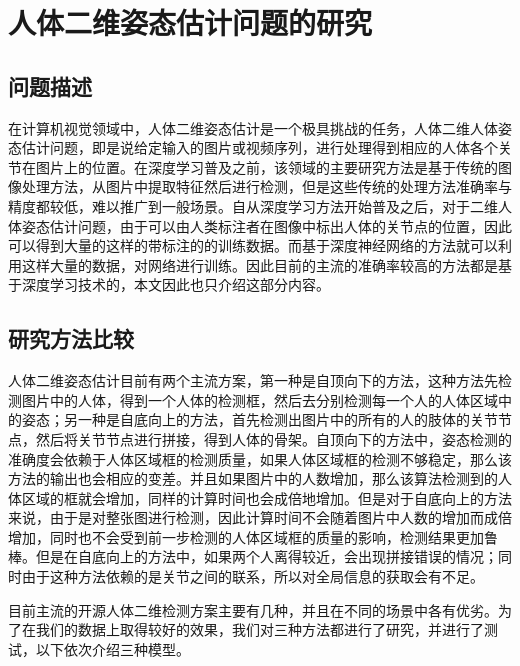 \section{人体二维姿态估计问题的研究}
\subsection{问题描述}
在计算机视觉领域中，人体二维姿态估计是一个极具挑战的任务，人体二维人体姿态估计问题，即是说给定输入的图片或视频序列，进行处理得到相应的人体各个关节在图片上的位置。在深度学习普及之前，该领域的主要研究方法是基于传统的图像处理方法，从图片中提取特征然后进行检测，但是这些传统的处理方法准确率与精度都较低，难以推广到一般场景。自从深度学习方法开始普及之后，对于二维人体姿态估计问题，由于可以由人类标注者在图像中标出人体的关节点的位置，因此可以得到大量的这样的带标注的的训练数据。而基于深度神经网络的方法就可以利用这样大量的数据，对网络进行训练。因此目前的主流的准确率较高的方法都是基于深度学习技术的，本文因此也只介绍这部分内容。

\subsection{研究方法比较}
人体二维姿态估计目前有两个主流方案，第一种是自顶向下的方法，这种方法先检测图片中的人体，得到一个人体的检测框，然后去分别检测每一个人的人体区域中的姿态；另一种是自底向上的方法，首先检测出图片中的所有的人的肢体的关节节点，然后将关节节点进行拼接，得到人体的骨架。自顶向下的方法中，姿态检测的准确度会依赖于人体区域框的检测质量，如果人体区域框的检测不够稳定，那么该方法的输出也会相应的变差。并且如果图片中的人数增加，那么该算法检测到的人体区域的框就会增加，同样的计算时间也会成倍地增加。但是对于自底向上的方法来说，由于是对整张图进行检测，因此计算时间不会随着图片中人数的增加而成倍增加，同时也不会受到前一步检测的人体区域框的质量的影响，检测结果更加鲁棒。但是在自底向上的方法中，如果两个人离得较近，会出现拼接错误的情况；同时由于这种方法依赖的是关节之间的联系，所以对全局信息的获取会有不足。

目前主流的开源人体二维检测方案主要有几种，并且在不同的场景中各有优劣。为了在我们的数据上取得较好的效果，我们对三种方法都进行了研究，并进行了测试，以下依次介绍三种模型。

